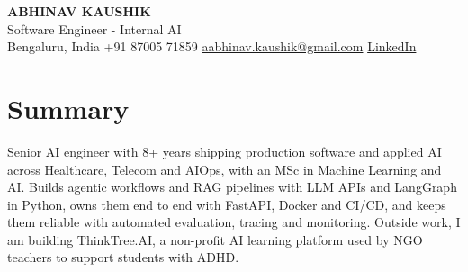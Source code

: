 \documentclass[10pt,a4paper]{article}
\begin{document}
\begin{center}
  {\LARGE\bfseries ABHINAV KAUSHIK}\\[2pt]
  {\large Software Engineer - Internal AI}\\[2pt]
  Bengaluru, India \textbar{} +91 87005 71859 \textbar{} \href{mailto:aabhinav.kaushik@gmail.com}{aabhinav.kaushik@gmail.com} \textbar{} \href{https://www.linkedin.com/in/abhinav-kaushik10/}{LinkedIn}  
\end{center}

\section{Summary}
Senior AI engineer with 8+ years shipping production software and applied AI across Healthcare, Telecom and AIOps, with an MSc in Machine Learning and AI. Builds agentic workflows and RAG pipelines with LLM APIs and LangGraph in Python, owns them end to end with FastAPI, Docker and CI/CD, and keeps them reliable with automated evaluation, tracing and monitoring. Outside work, I am building ThinkTree.AI, a non-profit AI learning platform used by NGO teachers to support students with ADHD.
\end{document}
